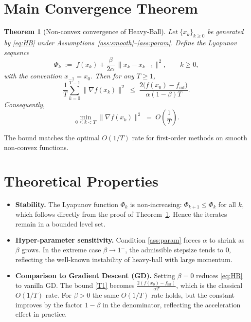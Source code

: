 \documentclass[11pt]{article}
\newtheorem{theorem}{Theorem}
\begin{document}
\section*{Main Convergence Theorem}
\begin{theorem}[Non‑convex convergence of Heavy‑Ball]\label{thm:HB}
Let $\{x_{k}\}_{k\ge0}$ be generated by \eqref{eq:HB} under
Assumptions~\ref{ass:smooth}–\ref{ass:param}.
Define the Lyapunov sequence
\[
\Phi_{k}\;:=\;f(x_{k})+\frac{\beta}{2\alpha}\,\|x_{k}-x_{k-1}\|^{2},
\qquad k\ge0,
\]
with the convention $x_{-1}=x_{0}$.
Then for any $T\ge1$,
\[
\frac{1}{T}\sum_{k=0}^{T-1}\big\|\nabla f(x_{k})\big\|^{2}
\;\le\;
\frac{2\big(f(x_{0})-f_{\inf}\big)}{\alpha(1-\beta)T}.
\tag{T1}
\]
Consequently,
\[
\min_{0\le k<T}\|\nabla f(x_{k})\|^{2}
\;=\;O\!\left(\frac{1}{T}\right).
\]
\end{theorem}
The bound matches the optimal $O(1/T)$ rate for first‑order methods on
smooth non‑convex functions.

\section*{Theoretical Properties}
\begin{itemize}
    \item \textbf{Stability.}  The Lyapunov function $\Phi_{k}$ is non‑increasing:
    $\Phi_{k+1}\le\Phi_{k}$ for all $k$, which follows directly from the proof
    of Theorem~\ref{thm:HB}.  Hence the iterates remain in a bounded level set.
    \item \textbf{Hyper‑parameter sensitivity.}
    Condition \eqref{ass:param} forces $\alpha$ to shrink as $\beta$ grows.
    In the extreme case $\beta\to1^{-}$, the admissible stepsize tends to $0$,
    reflecting the well‑known instability of heavy‑ball with large momentum.
    \item \textbf{Comparison to Gradient Descent (GD).}
    Setting $\beta=0$ reduces \eqref{eq:HB} to vanilla GD.
    The bound \eqref{T1} becomes
    $\frac{2(f(x_{0})-f_{\inf})}{\alpha T}$, which is the classical $O(1/T)$
    rate.  For $\beta>0$ the same $O(1/T)$ rate holds, but the constant
    improves by the factor $1-\beta$ in the denominator, reflecting the
    acceleration effect in practice.
\end{itemize}
\end{document}
